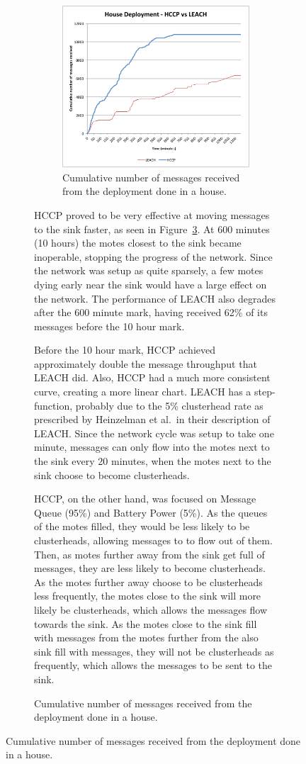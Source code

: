 \begin{figure}
\begin{figure}
\begin{figure}[tb]
    \centering
        \includegraphics[width=5in]{images/deployment/houseResults.pdf}
    \caption{Cumulative number of messages received from the deployment done in a house.}
    \label{fig:images_deployment_houseResults}
\end{figure}

HCCP proved to be very effective at moving messages to the sink faster, as seen in Figure~\ref{fig:images_deployment_houseResults}.  
At 600 minutes (10 hours) the 
motes closest to the sink became inoperable, stopping the progress of the network.
Since the network was setup as quite sparsely,  a few motes dying early near the sink would have a large 
effect on the network. The performance of LEACH also degrades after the 600 minute mark, having received
62\% of its messages before the 10 hour mark.

Before the 10 hour mark, HCCP achieved approximately double the message throughput
that LEACH did. Also, HCCP had a much more consistent curve, creating a more linear chart. LEACH
has a step-function, probably due to the 5\% clusterhead rate as prescribed by Heinzelman et al.\ 
in their description of LEACH. Since the network cycle was setup to take one minute, messages can only 
flow into the motes next to the sink every 20 minutes, when the motes next to the sink choose to become clusterheads.

HCCP, on the other hand, was focused on Message Queue (95\%) and Battery Power (5\%). As the queues of the motes filled, 
they would be less likely to be clusterheads, allowing messages to to flow out of them. 
Then, as motes further away from the sink get full of messages, they 
are less likely to become clusterheads. As the motes further away
choose to be clusterheads less frequently, the motes close to the sink 
will more likely be clusterheads, which allows the messages flow 
towards the sink. As the motes close to the sink fill with messages from the motes further
from the also sink fill with messages, they will not be clusterheads as frequently, which
allows the messages to be sent to the sink.



\end{figure}
\end{figure}

